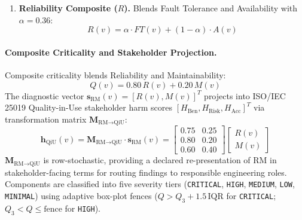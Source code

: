 \begin{enumerate}
    \begin{equation}
    \begin{aligned}
    \mathrm{CouplingRisk\_enh}(v) &= \min\!\big(1,\; \big[1 - |2\iota(v) - 1|\big]\,(1 + 0.10\,\mathrm{PC}(v))\big) \\
    M(v) = & \; 0.35\,\mathrm{BT}(v) + 0.30\,w_{\text{out}}(v) + 0.15\,\mathrm{CQP}(v) \\
           & + 0.12\,\mathrm{CouplingRisk\_enh}(v) + 0.08\,(1-\mathrm{CC}(v))
    \end{aligned}
    \end{equation}
    \item \textbf{Reliability Composite ($R$).} Blends Fault Tolerance and Availability with $\alpha = 0.36$:
    \begin{equation}
    R(v) = \alpha \cdot FT(v) + (1-\alpha) \cdot A(v)
    \end{equation}
\end{enumerate}

\paragraph{Composite Criticality and Stakeholder Projection.}
Composite criticality blends Reliability and Maintainability:
\begin{equation}
Q(v) = 0.80\,R(v) + 0.20\,M(v)
\end{equation}
The diagnostic vector $\mathbf{s}_{\text{RM}}(v) = [R(v), M(v)]^T$ projects into ISO/IEC 25019 Quality-in-Use stakeholder harm scores $[H_{\text{Ben}}, H_{\text{Risk}}, H_{\text{Acc}}]^T$ via transformation matrix $\mathbf{M}_{\text{RM} \to \text{QiU}}$:
\begin{equation}
\mathbf{h}_{\text{QiU}}(v) = \mathbf{M}_{\text{RM} \to \text{QiU}} \cdot \mathbf{s}_{\text{RM}}(v) = \begin{bmatrix} 0.75 & 0.25 \\ 0.80 & 0.20 \\ 0.60 & 0.40 \end{bmatrix} \begin{bmatrix} R(v) \\ M(v) \end{bmatrix}
\end{equation}
$\mathbf{M}_{\text{RM} \to \text{QiU}}$ is row-stochastic, providing a declared re-presentation of RM in stakeholder-facing terms for routing findings to responsible engineering roles. Components are classified into five severity tiers (\texttt{CRITICAL}, \texttt{HIGH}, \texttt{MEDIUM}, \texttt{LOW}, \texttt{MINIMAL}) using adaptive box-plot fences ($Q > Q_3 + 1.5\,\mathrm{IQR}$ for \texttt{CRITICAL}; $Q_3 < Q \le \text{fence}$ for \texttt{HIGH}).

